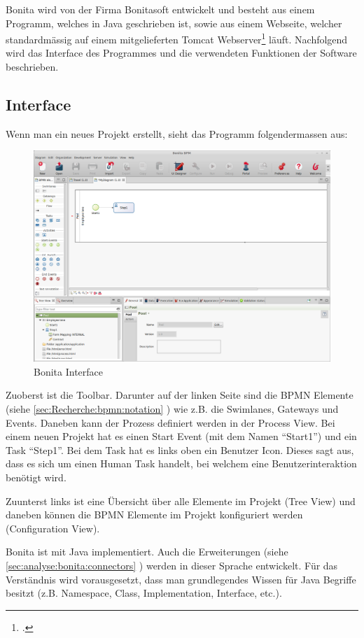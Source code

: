 Bonita wird von der Firma Bonitasoft entwickelt und besteht aus einem Programm, welches in Java geschrieben ist, sowie aus einem Webseite, welcher standardmässig auf einem mitgelieferten Tomcat Webserver\footcite{Tomcat_2016-06-12} läuft.
Nachfolgend wird das Interface des Programmes und die verwendeten Funktionen der Software beschrieben.

\subsection{Interface}
Wenn man ein neues Projekt erstellt, sieht das Programm folgendermassen aus:
\begin{figure}[H]
	\centering
	\includegraphics[width=1\textwidth]{images/bonita.png}
	\caption{Bonita Interface}
	\label{fig:analyse:bonita:interface}
\end{figure}
Zuoberst ist die Toolbar. Darunter auf der linken Seite sind die BPMN Elemente (siehe \cref{sec:Recherche:bpmn:notation} ) wie z.B. die Swimlanes, Gateways und Events. Daneben kann der Prozess definiert werden in der Process View. Bei einem neuen Projekt hat es einen Start Event (mit dem Namen "`Start1"') und ein Task "`Step1"'. Bei dem Task hat es links oben ein Benutzer Icon. Dieses sagt aus, dass es sich um einen Human Task handelt, bei welchem eine Benutzerinteraktion benötigt wird.

Zuunterst links ist eine Übersicht über alle Elemente im Projekt (Tree View) und daneben können die BPMN Elemente im Projekt konfiguriert werden (Configuration View).

Bonita ist mit Java implementiert. Auch die Erweiterungen (siehe \cref{sec:analyse:bonita:connectors} ) werden in dieser Sprache entwickelt. Für das Verständnis wird vorausgesetzt, dass man grundlegendes Wissen für Java Begriffe besitzt (z.B. Namespace, Class, Implementation, Interface, etc.).

